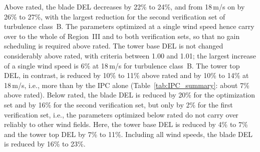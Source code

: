 Above rated, the blade DEL decreases by 22\% to 24\%, and from 18\,m/s on by 26\% to 27\%, with the largest reduction for the second verification set of turbulence class~B. The parameters optimized at a single wind speed hence carry over to the whole of Region~III and to both verification sets, so that no gain scheduling is required above rated. The tower base DEL is not changed considerably above rated, with criteria between 1.00 and 1.01; the largest increase of a single wind speed is 6\% at 18\,m/s for turbulence class~B. The tower top DEL, in contrast, is reduced by 10\% to 11\% above rated and by 10\% to 14\% at 18\,m/s, i.e., more than by the IPC alone (Table~\ref{tab:IPC_summary}: about 7\% above rated). Below rated, the blade DEL is reduced by 20\% for the optimization set and by 16\% for the second verification set, but only by 2\% for the first verification set, i.e., the parameters optimized below rated do not carry over reliably to other wind fields. Here, the tower base DEL is reduced by 4\% to 7\% and the tower top DEL by 7\% to 11\%. Including all wind speeds, the blade DEL is reduced by 16\% to 23\%.

